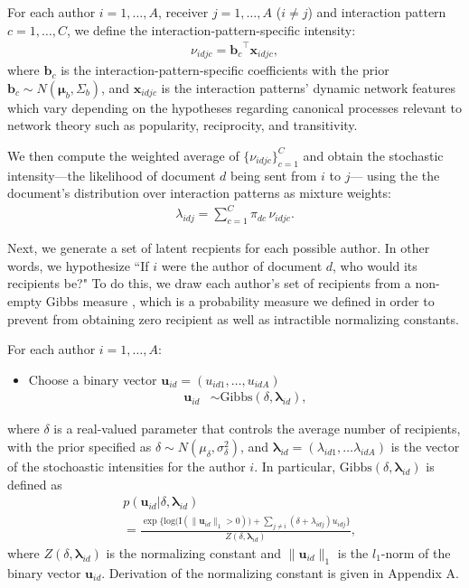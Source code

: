 \documentclass{article}
\begin{document}
For each author $i = 1,\ldots,A$, receiver $j = 1,\ldots,A$ ($i \neq j$) and interaction pattern $c=1,\ldots,C$, we define the interaction-pattern-specific intensity:
\begin{align*}
\nu_{idjc} = {\boldsymbol{b}_c}^{\top}\boldsymbol{x}_{idjc},
\end{align*}
where $\boldsymbol{b}_c$ is the interaction-pattern-specific coefficients with the prior $\boldsymbol{b}_c \sim N(\boldsymbol{\mu}_b,\Sigma_b)$, and $\boldsymbol{x}_{idjc}$ is the interaction patterns' dynamic network features which vary depending on the hypotheses regarding canonical processes relevant to network theory such as popularity, reciprocity, and transitivity. 

We then compute the weighted average of $\{\nu_{idjc}\}_{c=1}^C$ and obtain the stochastic intensity---the likelihood of document $d$ being sent from $i$ to $j$--- using the the document's distribution over interaction patterns as mixture weights:
\begin{align*}
\lambda_{idj} =\sum_{c=1}^{C} \pi_{dc}\, \nu_{idjc}.
\end{align*}

Next, we generate a set of latent recpients for each
possible author. In other words, we hypothesize ``If $i$ were the
author of document $d$, who would its recipients be?" To do this, we draw each author's set of recipients from a non-empty Gibbs measure \cite{fellows2017removing}, which is a probability measure we defined in order to prevent from obtaining zero recipient as well as intractible normalizing constants. 

For each author $i =1,\ldots,A$:
\begin{itemize}
	\item Choose a binary vector $\boldsymbol{u}_{id}= (u_{id1},
	\ldots, u_{idA})$
	\begin{align*} \boldsymbol{u}_{id} & \sim
	\mbox{Gibbs}(\delta, \boldsymbol{\lambda}_{id}),
	\end{align*}
\end{itemize}
where $\delta$ is a real-valued parameter that controls the average number of recipients, with the prior specified as $\delta \sim N(\mu_\delta,\sigma^2_\delta)$, and $\boldsymbol{\lambda}_{id}=(\lambda_{id1},\ldots\lambda_{idA})$ is the vector of the stochoastic intensities for the author $i$. In particular, $\mbox{Gibbs}(\delta, \boldsymbol{\lambda}_{id})$ is defined as
\begin{align*}
&p(\boldsymbol{u}_{id}|\delta, \boldsymbol{\lambda}_{id}) \\&= \frac{\exp\Big\{\mbox{log}\Big(\text{I}( \lVert \boldsymbol{u}_{id}\rVert_1 > 0 )\Big) + \sum_{j \neq i} (\delta+\lambda_{idj})u_{idj}\Big\}}{Z(\delta,\boldsymbol{\lambda}_{id})} ,
\end{align*}
where $Z(\delta,\boldsymbol{\lambda}_{id})$ is the normalizing constant and $\lVert \boldsymbol{u}_{id}\rVert_1$ is the $l_1$-norm of the binary vector $\boldsymbol{u}_{id}$. Derivation of the normalizing constant is given in Appendix A. 
\end{document}
